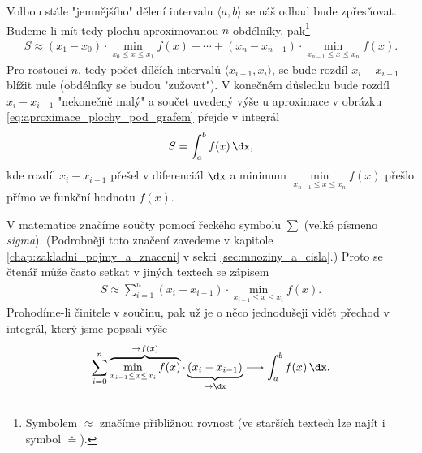 Volbou stále "jemnějšího" dělení intervalu $\langle a,b \rangle$ se náš odhad bude zpřesňovat. Budeme-li mít tedy plochu aproximovanou $n$ obdélníky, pak\footnote{Symbolem $\approx$ značíme přibližnou rovnost (ve starších textech lze najít i symbol $\doteq$).}
\begin{align}
\label{eq:aproximace_plochy_pod_grafem}
S \approx (x_1-x_0) \cdot \min\limits_{x_{0} \leq x \leq x_1}{f(x)} +\cdots + (x_n-x_{n-1}) \cdot \min\limits_{x_{n-1} \leq x \leq x_n}{f(x)}.
\end{align}
Pro rostoucí $n$, tedy počet dílčích intervalů $\langle x_{i-1},x_i \rangle$, se bude rozdíl $x_i-x_{i-1}$ blížit nule (obdélníky se budou "zužovat"). V konečném důsledku bude rozdíl $x_i-x_{i-1}$ "nekonečně malý" a součet uvedený výše u aproximace v obrázku \ref{eq:aproximace_plochy_pod_grafem} přejde v integrál
\begin{align*}
S=\int_{a}^{b}{f(x)\,\dx},
\end{align*}
kde rozdíl $x_i-x_{i-1}$ přešel v diferenciál $\dx$ a minimum $\min\limits_{x_{n-1} \leq x \leq x_n}{f(x)}$ přešlo přímo ve funkční hodnotu $f(x)$.\par
V matematice značíme součty pomocí řeckého symbolu $\sum$ (velké písmeno \emph{sigma}). (Podrobněji toto značení zavedeme v kapitole \ref{chap:zakladni_pojmy_a_znaceni} v sekci \ref{sec:mnoziny_a_cisla}.) Proto se čtenář může často setkat v jiných textech se zápisem
\begin{align*}
S \approx \sum_{i=1}^{n}{(x_i-x_{i-1}) \cdot \min\limits_{x_{i-1} \leq x \leq x_i}{f(x)}}.
\end{align*}
Prohodíme-li činitele v součinu, pak už je o něco jednodušeji vidět přechod v integrál, který jsme popsali výše
\begin{align*}
\sum_{i=0}^{n}{\overbrace{\min\limits_{x_{i-1} \leq x \leq x_i}{f(x)}}^{\rightarrow f(x)} \cdot \underbrace{(x_i-x_{i-1})}_{\rightarrow \dx}} \longrightarrow \int_{a}^{b}{f(x)\,\dx}.
\end{align*}


